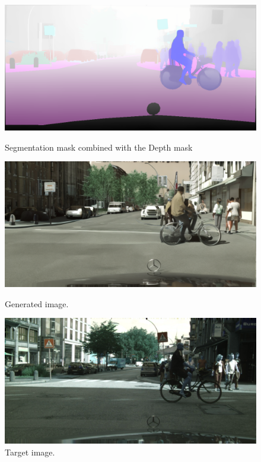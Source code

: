 \documentclass[12pt,a4paper]{report}
\begin{document}
\begin{figure}[h]
    \centering
    \begin{minipage}{0.6\textwidth}
        \centering
        \includegraphics[width=\textwidth]{17_before_output.png}
        \caption{Segmentation mask combined with the Depth mask}
        \label{fig:image1}
    \end{minipage}
    \hfill
    \begin{minipage}{0.6\textwidth}
        \centering
        \includegraphics[width=\textwidth]{17_output.png}
        \caption{Generated image.}
        \label{fig:image2}
    \end{minipage}
        \begin{minipage}{0.6\textwidth}
        \centering
        \includegraphics[width=\textwidth]{17_target.png}
        \caption{Target image.}
        \label{fig:image2}
    \end{minipage}
\end{figure}
\end{document}
